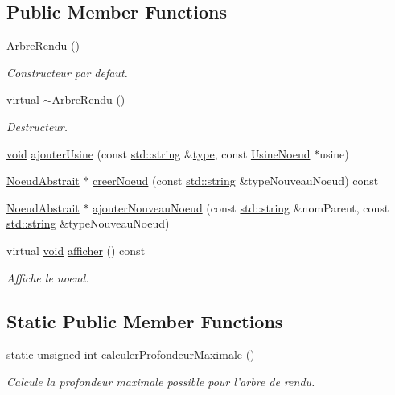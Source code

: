 \subsection*{Public Member Functions}
\begin{DoxyCompactItemize}
\item 
\hyperlink{group__inf2990_gaef1e98a66c4f1d3b468c786edee45ae6}{Arbre\-Rendu} ()
\begin{DoxyCompactList}\small\item\em Constructeur par defaut. \end{DoxyCompactList}\item 
virtual \hyperlink{group__inf2990_gadb462923759da0ff632dad097b7bfdab}{$\sim$\-Arbre\-Rendu} ()
\begin{DoxyCompactList}\small\item\em Destructeur. \end{DoxyCompactList}\item 
\hyperlink{wglew_8h_aeea6e3dfae3acf232096f57d2d57f084}{void} \hyperlink{group__inf2990_gaef33737fda55a3916e895e1adc3e88ae}{ajouter\-Usine} (const \hyperlink{glew_8h_ae84541b4f3d8e1ea24ec0f466a8c568b}{std\-::string} \&\hyperlink{fmod_8h_a5338b9cb3874378d7e5adfbe80a8a381}{type}, const \hyperlink{class_usine_noeud}{Usine\-Noeud} $\ast$usine)
\item 
\hyperlink{class_noeud_abstrait}{Noeud\-Abstrait} $\ast$ \hyperlink{group__inf2990_ga33ae9013f9cec73854d32527b85b41f9}{creer\-Noeud} (const \hyperlink{glew_8h_ae84541b4f3d8e1ea24ec0f466a8c568b}{std\-::string} \&type\-Nouveau\-Noeud) const 
\item 
\hyperlink{class_noeud_abstrait}{Noeud\-Abstrait} $\ast$ \hyperlink{group__inf2990_gac10e5f0623af502d67f72aef764206a3}{ajouter\-Nouveau\-Noeud} (const \hyperlink{glew_8h_ae84541b4f3d8e1ea24ec0f466a8c568b}{std\-::string} \&nom\-Parent, const \hyperlink{glew_8h_ae84541b4f3d8e1ea24ec0f466a8c568b}{std\-::string} \&type\-Nouveau\-Noeud)
\item 
virtual \hyperlink{wglew_8h_aeea6e3dfae3acf232096f57d2d57f084}{void} \hyperlink{group__inf2990_ga0155db63d70675bcec04034112447dab}{afficher} () const 
\begin{DoxyCompactList}\small\item\em Affiche le noeud. \end{DoxyCompactList}\end{DoxyCompactItemize}
\subsection*{Static Public Member Functions}
\begin{DoxyCompactItemize}
\item 
static \hyperlink{_free_image_8h_a425076c7067a1b5166e2cc530e914814}{unsigned} \hyperlink{wglew_8h_a500a82aecba06f4550f6849b8099ca21}{int} \hyperlink{group__inf2990_gacf0e53d52040b07cd6550fda79867bd5}{calculer\-Profondeur\-Maximale} ()
\begin{DoxyCompactList}\small\item\em Calcule la profondeur maximale possible pour l'arbre de rendu. \end{DoxyCompactList}\end{DoxyCompactItemize}
